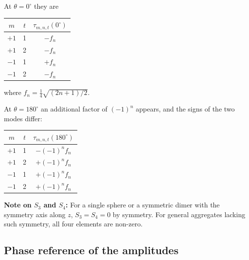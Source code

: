 \documentclass[11pt,a4paper]{article}
\begin{document}
At $\theta = 0^\circ$ they are

\begin{center}
\begin{tabular}{@{} ccc @{}}
  \toprule
  $m$ & $t$ & $\tau_{m,n,t}(0^\circ)$ \\
  \midrule
  $+1$ & 1 & $-f_n$ \\
  $+1$ & 2 & $-f_n$ \\
  $-1$ & 1 & $+f_n$ \\
  $-1$ & 2 & $-f_n$ \\
  \bottomrule
\end{tabular}
\end{center}
where $f_n = \frac{1}{4}\sqrt{(2n+1)/2}$.

At $\theta = 180^\circ$ an additional factor of $(-1)^n$ appears, and the signs of the two modes differ:

\begin{center}
\begin{tabular}{@{} ccc @{}}
  \toprule
  $m$ & $t$ & $\tau_{m,n,t}(180^\circ)$ \\
  \midrule
  $+1$ & 1 & $-(-1)^n f_n$ \\
  $+1$ & 2 & $+(-1)^n f_n$ \\
  $-1$ & 1 & $+(-1)^n f_n$ \\
  $-1$ & 2 & $+(-1)^n f_n$ \\
  \bottomrule
\end{tabular}
\end{center}

\textbf{Note on $S_3$ and $S_4$:}
For a single sphere or a symmetric dimer with the symmetry axis along $z$, $S_3 = S_4 = 0$ by symmetry.
For general aggregates lacking such symmetry, all four elements are non-zero.

\subsection{Phase reference of the amplitudes}
\label{sec:phase-reference}
\end{document}
